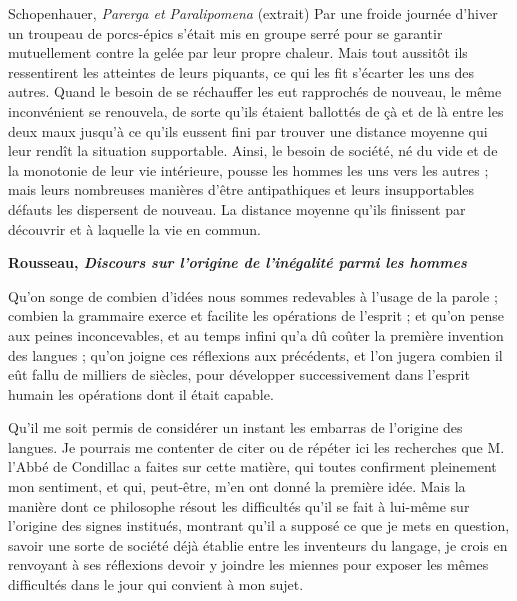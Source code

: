 \begin{bbcomplement}{Schopenhauer, \textit{Parerga et Paralipomena} (extrait)}
Par une froide journée d’hiver un troupeau de porcs-épics s’était mis en groupe serré pour se garantir mutuellement contre la gelée par leur propre chaleur. Mais tout aussitôt ils ressentirent les atteintes de leurs piquants, ce qui les fit s’écarter les uns des autres. Quand le besoin de se réchauffer les eut rapprochés de nouveau, le même inconvénient se renouvela, de sorte qu’ils étaient ballottés de çà et de là entre les deux maux jusqu’à ce qu’ils eussent fini par trouver une distance moyenne qui leur rendît la situation supportable. Ainsi, le besoin de société, né du vide et de la monotonie de leur vie intérieure, pousse les hommes les uns vers les autres ; mais leurs nombreuses manières d’être antipathiques et leurs insupportables défauts les dispersent de nouveau. La distance moyenne qu’ils finissent par découvrir et à laquelle la vie en commun.

\begin{center}\bfseries Rousseau, \textit{Discours sur l’origine de l’inégalité parmi les hommes}\end{center}
Qu’on songe de combien d’idées nous sommes redevables à l’usage de la parole ; combien la grammaire exerce et facilite les opérations de l’esprit ; et qu’on pense aux peines inconcevables, et au temps infini qu’a dû coûter la première invention des langues ; qu’on joigne ces réflexions aux précédents, et l’on jugera combien il eût fallu de milliers de siècles, pour développer successivement dans l’esprit humain les opérations dont il était capable.

Qu’il me soit permis de considérer un instant les embarras de l’origine des langues. Je pourrais me contenter de citer ou de répéter ici les recherches que M. l’Abbé de Condillac a faites sur cette matière, qui toutes confirment pleinement mon sentiment, et qui, peut-être, m’en ont donné la première idée. Mais la manière dont ce philosophe résout les difficultés qu’il se fait à lui-même sur l’origine des signes institués, montrant qu’il a supposé ce que je mets en question, savoir une sorte de société déjà établie entre les inventeurs du langage, je crois en renvoyant à ses réflexions devoir y joindre les miennes pour exposer les mêmes difficultés dans le jour qui convient à mon sujet.


\end{bbcomplement}

